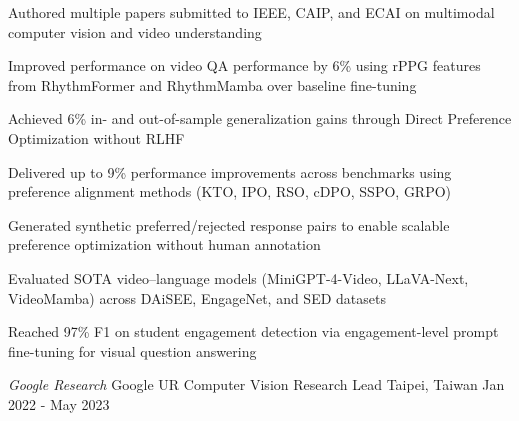 \begin{cventries}
{      %
      \begin{cvitems} %
        \item {Authored multiple papers submitted to IEEE, CAIP, and ECAI on multimodal computer vision and video understanding}
        \item {Improved performance on video QA performance by 6\% using rPPG features from RhythmFormer and RhythmMamba over baseline fine-tuning}
        \item {Achieved 6\% in- and out-of-sample generalization gains through Direct Preference Optimization without RLHF}
        \item {Delivered up to 9\% performance improvements across benchmarks using preference alignment methods (KTO, IPO, RSO, cDPO, SSPO, GRPO)}
        \item {Generated synthetic preferred/rejected response pairs to enable scalable preference optimization without human annotation}
        \item {Evaluated SOTA video–language models (MiniGPT-4-Video, LLaVA-Next, VideoMamba) across DAiSEE, EngageNet, and SED datasets}
        \item {Reached 97\% F1 on student engagement detection via engagement-level prompt fine-tuning for visual question answering}
      \end{cvitems}
    }
 \cventry
    {\emph{Google Research}} %
    {Google UR Computer Vision Research Lead} %
    {Taipei, Taiwan} %
    {Jan 2022 - May 2023} %
    {
}
\end{cventries}

